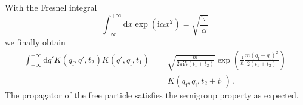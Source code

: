 \documentclass[11pt,DIV=19,parskip=half]{scrartcl}
\begin{document}
With the Fresnel integral
\begin{equation}
\int_{-\infty}^{+\infty}\text{d}x\exp\left(\text{i}\alpha x^2\right) = \sqrt{\frac{\text{i}\pi}{\alpha}}
\end{equation}
we finally obtain
\begin{equation}
 \begin{aligned}
  \int_{-\infty}^{+\infty}\text{d}q' K(q_\text{f}, q', t_2)K(q', q_\text{i}, t_1) &= 
  \sqrt{\frac{m}{2\pi\text{i}\hbar(t_1+t_2)}}\exp\left(\frac{\text{i}}{\hbar}
                                \frac{m(q_\text{f}-q_\text{i})^2}{2(t_1+t_2)}\right)\\
  &= K(q_\text{f}, q_\text{i}, t_2+t_1)\,.
 \end{aligned}
\end{equation}
The propagator of the free particle satisfies the semigroup property as expected.
\end{document}
